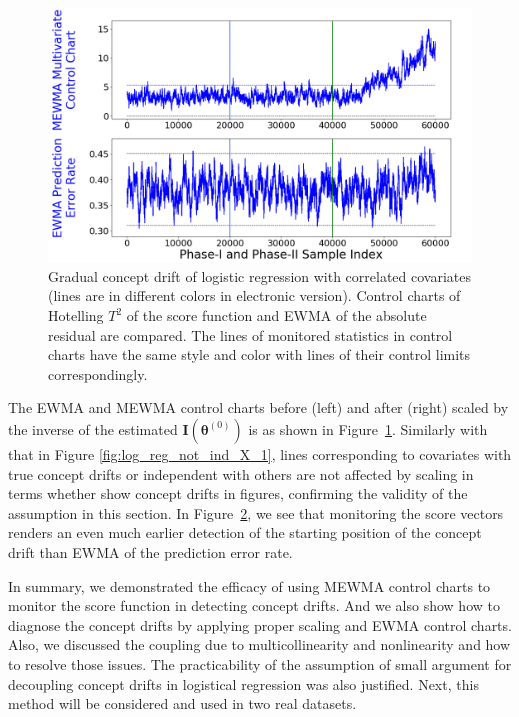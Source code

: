 \documentclass[twoside,11pt]{article}
\begin{document}
\begin{enumerate}[(I)]
\begin{figure}[!htbp]
  \label{fig:log_reg_not_ind_X_grad_cd}
\end{figure}
\begin{figure}[!htbp]
\centering
\includegraphics[width = 0.6\linewidth]{../figures/v14/sim_7/logi_small/1_sim7_logi_1e-08_0_005_1.png}
  \caption{Gradual concept drift of logistic regression with correlated covariates (lines are in different colors in electronic version). Control charts of Hotelling $T^2$ of the score function and EWMA of the absolute residual are compared. The lines of monitored statistics in control charts have the same style and color with lines of their control limits correspondingly.}
  \label{fig:log_reg_ind_X_grad_cd_comp}
\end{figure}

The EWMA and MEWMA control charts before (left) and after (right) scaled by {the inverse of the estimated} ${\mathbf {I}}(\bm { \theta}^{(0)})$ is as shown in Figure~\ref{fig:log_reg_not_ind_X_grad_cd}. Similarly with that in Figure \ref{fig:log_reg_not_ind_X_1}, lines corresponding to covariates with true concept drifts or independent with others are not affected by scaling in terms whether show concept drifts in figures, confirming the validity of the assumption in this section. In Figure~\ref{fig:log_reg_ind_X_grad_cd_comp}, we see that monitoring the score vectors renders an even much earlier detection of the starting position of the concept drift than EWMA of the prediction error rate.

In summary, we demonstrated the efficacy of using MEWMA control charts to monitor the score function in detecting concept drifts. And we also show how to diagnose the concept drifts by applying proper scaling and EWMA control charts. Also, we discussed the coupling due to multicollinearity and nonlinearity and how to resolve those issues. The practicability of the assumption of small argument for decoupling concept drifts in logistical regression was also justified. Next, this method will be considered and used in two real datasets.
\end{enumerate}
\end{document}
